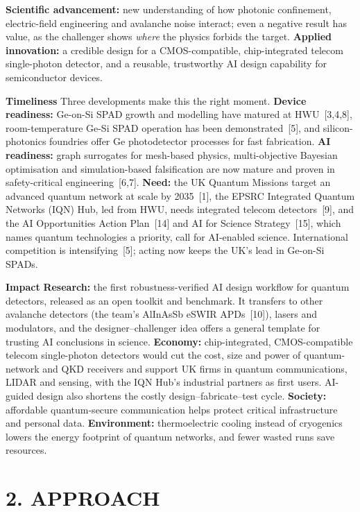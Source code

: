\documentclass[11pt,a4paper]{article}
\newcommand{\cn}[1]{\textcolor{citeblue}{[#1]}}
\begin{document}
\textbf{Scientific advancement:} new understanding of how photonic confinement, electric-field engineering and avalanche noise interact; even a negative result has value, as the challenger shows \emph{where} the physics forbids the target. \textbf{Applied innovation:} a credible design for a CMOS-compatible, chip-integrated telecom single-photon detector, and a reusable, trustworthy AI design capability for semiconductor devices.

\textbf{Timeliness}
Three developments make this the right moment. \textbf{Device readiness:} Ge-on-Si SPAD growth and modelling have matured at HWU~\cn{3,4,8}, room-temperature Ge-Si SPAD operation has been demonstrated~\cn{5}, and silicon-photonics foundries offer Ge photodetector processes for fast fabrication. \textbf{AI readiness:} graph surrogates for mesh-based physics, multi-objective Bayesian optimisation and simulation-based falsification are now mature and proven in safety-critical engineering~\cn{6,7}. \textbf{Need:} the UK Quantum Missions target an advanced quantum network at scale by 2035~\cn{1}, the EPSRC Integrated Quantum Networks (IQN) Hub, led from HWU, needs integrated telecom detectors~\cn{9}, and the AI Opportunities Action Plan~\cn{14} and AI for Science Strategy~\cn{15}, which names quantum technologies a priority, call for AI-enabled science. International competition is intensifying~\cn{5}; acting now keeps the UK's lead in Ge-on-Si SPADs.

\textbf{Impact}
\textbf{Research:} the first robustness-verified AI design workflow for quantum detectors, released as an open toolkit and benchmark. It transfers to other avalanche detectors (the team's AlInAsSb eSWIR APDs~\cn{10}), lasers and modulators, and the designer--challenger idea offers a general template for trusting AI conclusions in science. \textbf{Economy:} chip-integrated, CMOS-compatible telecom single-photon detectors would cut the cost, size and power of quantum-network and QKD receivers and support UK firms in quantum communications, LIDAR and sensing, with the IQN Hub's industrial partners as first users. AI-guided design also shortens the costly design--fabricate--test cycle. \textbf{Society:} affordable quantum-secure communication helps protect critical infrastructure and personal data. \textbf{Environment:} thermoelectric cooling instead of cryogenics lowers the energy footprint of quantum networks, and fewer wasted runs save resources.

\section{2. APPROACH}
\end{document}
